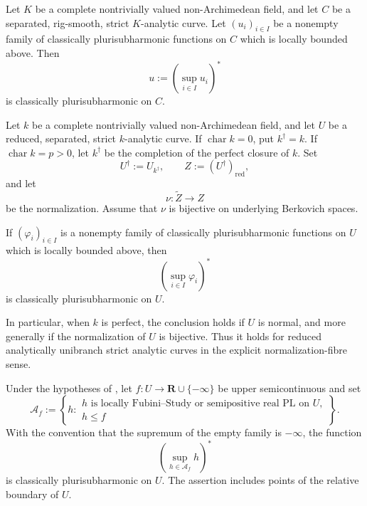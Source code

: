 \begin{lemma}
\label{lem:p031-rigsmooth-curve-envelope}
Let \(K\) be a complete nontrivially valued non-Archimedean field, and let
\(C\) be a separated, rig-smooth, strict \(K\)-analytic curve.  Let
\((u_i)_{i\in I}\) be a nonempty family of classically plurisubharmonic
functions on \(C\) which is locally bounded above.  Then
\[
                 u:=\left(\sup_{i\in I}u_i\right)^*
\]
is classically plurisubharmonic on \(C\).
\end{lemma}

\begin{theorem}
\label{thm:p031-perfected-unibranch-curve-envelope}
Let \(k\) be a complete nontrivially valued non-Archimedean field, and let
\(U\) be a reduced, separated, strict \(k\)-analytic curve.  If
\(\operatorname{char}k=0\), put \(k^\dagger=k\).  If
\(\operatorname{char}k=p>0\), let \(k^\dagger\) be the completion of the
perfect closure of \(k\).  Set
\[
 U^\dagger:=U_{k^\dagger},
 \qquad Z:=(U^\dagger)_{\mathrm{red}},
\]
and let
\[
                   \nu:\widetilde Z\longrightarrow Z
\]
be the normalization.  Assume that \(\nu\) is bijective on underlying
Berkovich spaces.

If \((\varphi_i)_{i\in I}\) is a nonempty family of classically
plurisubharmonic functions on \(U\) which is locally bounded above, then
\begin{equation}
\label{eq:p031-perfected-unibranch-envelope}
             \left(\sup_{i\in I}\varphi_i\right)^*
\end{equation}
is classically plurisubharmonic on \(U\).

In particular, when \(k\) is perfect, the conclusion holds if \(U\) is
normal, and more generally if the normalization of \(U\) is bijective.
Thus it holds for reduced analytically unibranch strict analytic curves in
the explicit normalization-fibre sense.
\end{theorem}

\begin{corollary}
\label{cor:p031-local-fs-envelope-on-unibranch-curves}
Under the hypotheses of
, let
\(f:U\to\mathbf R\cup\{-\infty\}\) be upper semicontinuous and set
\[
 \mathcal A_f:=
 \left\{
 h:\begin{array}{l}
 h\text{ is locally Fubini--Study or semipositive real PL on }U,\\
 h\leq f
 \end{array}
 \right\}.
\]
With the convention that the supremum of the empty family is \(-\infty\),
the function
\begin{equation}
\label{eq:p031-local-fs-envelope-on-unibranch-curves}
              \left(\sup_{h\in\mathcal A_f}h\right)^*
\end{equation}
is classically plurisubharmonic on \(U\).
The assertion includes points of the relative boundary of \(U\).
\end{corollary}
